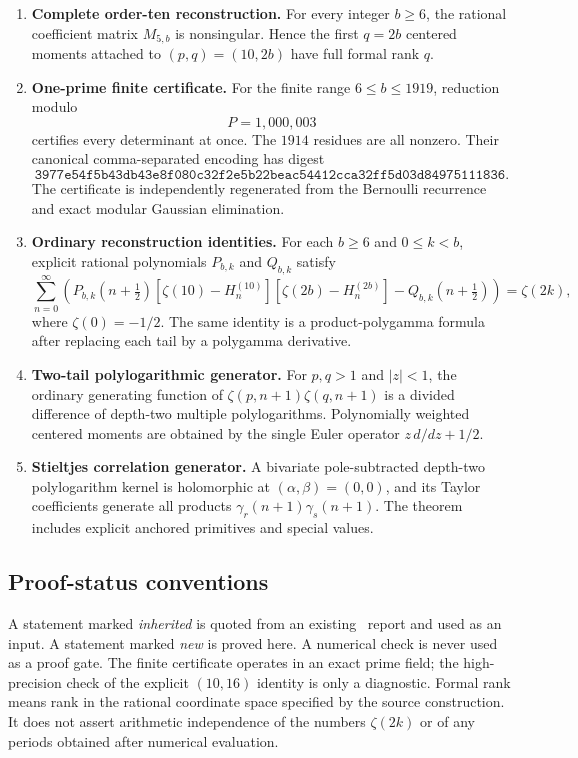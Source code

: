 \begin{enumerate}[label=\textbf{M\arabic*.}]
\item \textbf{Complete order-ten reconstruction.}
For every integer $b\ge6$, the rational coefficient matrix $M_{5,b}$
is nonsingular.  Hence the first $q=2b$ centered moments attached to
$(p,q)=(10,2b)$ have full formal rank $q$.

\item \textbf{One-prime finite certificate.}
For the finite range $6\le b\le1919$, reduction modulo
\[
 P=1{,}000{,}003
\]
certifies every determinant at once.  The $1914$ residues are all
nonzero.  Their canonical comma-separated encoding has digest
\[
 \texttt{3977e54f5b43db43e8f080c32f2e5b22beac54412cca32ff5d03d84975111836}.
\]
The certificate is independently regenerated from the Bernoulli
recurrence and exact modular Gaussian elimination.

\item \textbf{Ordinary reconstruction identities.}
For each $b\ge6$ and $0\le k<b$, explicit rational polynomials
$P_{b,k}$ and $Q_{b,k}$ satisfy
\[
 \sum_{n=0}^{\infty}
 \left(P_{b,k}(n+\tfrac12)
       [\zeta(10)-H_n^{(10)}][\zeta(2b)-H_n^{(2b)}]
       -Q_{b,k}(n+\tfrac12)\right)=\zeta(2k),
\]
where $\zeta(0)=-1/2$.  The same identity is a product-polygamma
formula after replacing each tail by a polygamma derivative.

\item \textbf{Two-tail polylogarithmic generator.}
For $p,q>1$ and $|z|<1$, the ordinary generating function of
$\zeta(p,n+1)\zeta(q,n+1)$ is a divided difference of depth-two
multiple polylogarithms.  Polynomially weighted centered moments are
obtained by the single Euler operator $z\,d/dz+1/2$.

\item \textbf{Stieltjes correlation generator.}
A bivariate pole-subtracted depth-two polylogarithm kernel is holomorphic
at $(\alpha,\beta)=(0,0)$, and its Taylor coefficients generate all
products $\gamma_r(n+1)\gamma_s(n+1)$.  The theorem includes explicit
anchored primitives and special values.
\end{enumerate}

\subsection{Proof-status conventions}

A statement marked \emph{inherited} is quoted from an existing \Repo\
report and used as an input.  A statement marked \emph{new} is proved
here.  A numerical check is never used as a proof gate.  The finite
certificate operates in an exact prime field; the high-precision check
of the explicit $(10,16)$ identity is only a diagnostic.  Formal rank
means rank in the rational coordinate space specified by the source
construction.  It does not assert arithmetic independence of the
numbers $\zeta(2k)$ or of any periods obtained after numerical
evaluation.

